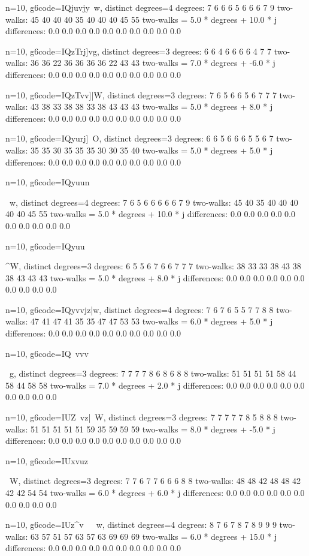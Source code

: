 {{{{{{{{{{{n=10, g6code=IQjuvjy~w, distinct degrees=4
degrees: 7 6 6 6 5 6 6 6 7 9 
two-walks: 45 40 40 40 35 40 40 40 45 55 
two-walks = 5.0 * degrees + 10.0 * j
differences: 0.0 0.0 0.0 0.0 0.0 0.0 0.0 0.0 0.0 0.0 

n=10, g6code=IQzTrj]vg, distinct degrees=3
degrees: 6 6 4 6 6 6 6 4 7 7 
two-walks: 36 36 22 36 36 36 36 22 43 43 
two-walks = 7.0 * degrees + -6.0 * j
differences: 0.0 0.0 0.0 0.0 0.0 0.0 0.0 0.0 0.0 0.0 

n=10, g6code=IQzTvv]|W, distinct degrees=3
degrees: 7 6 5 6 6 5 6 7 7 7 
two-walks: 43 38 33 38 38 33 38 43 43 43 
two-walks = 5.0 * degrees + 8.0 * j
differences: 0.0 0.0 0.0 0.0 0.0 0.0 0.0 0.0 0.0 0.0 

n=10, g6code=IQyurj]~O, distinct degrees=3
degrees: 6 6 5 6 6 6 5 5 6 7 
two-walks: 35 35 30 35 35 35 30 30 35 40 
two-walks = 5.0 * degrees + 5.0 * j
differences: 0.0 0.0 0.0 0.0 0.0 0.0 0.0 0.0 0.0 0.0 

n=10, g6code=IQyuun{~w, distinct degrees=4
degrees: 7 6 5 6 6 6 6 6 7 9 
two-walks: 45 40 35 40 40 40 40 40 45 55 
two-walks = 5.0 * degrees + 10.0 * j
differences: 0.0 0.0 0.0 0.0 0.0 0.0 0.0 0.0 0.0 0.0 

n=10, g6code=IQyuu}}^W, distinct degrees=3
degrees: 6 5 5 6 7 6 6 7 7 7 
two-walks: 38 33 33 38 43 38 38 43 43 43 
two-walks = 5.0 * degrees + 8.0 * j
differences: 0.0 0.0 0.0 0.0 0.0 0.0 0.0 0.0 0.0 0.0 

n=10, g6code=IQyvvjz|w, distinct degrees=4
degrees: 7 6 7 6 5 5 7 7 8 8 
two-walks: 47 41 47 41 35 35 47 47 53 53 
two-walks = 6.0 * degrees + 5.0 * j
differences: 0.0 0.0 0.0 0.0 0.0 0.0 0.0 0.0 0.0 0.0 

n=10, g6code=IQ~vvv}~g, distinct degrees=3
degrees: 7 7 7 7 8 6 8 6 8 8 
two-walks: 51 51 51 51 58 44 58 44 58 58 
two-walks = 7.0 * degrees + 2.0 * j
differences: 0.0 0.0 0.0 0.0 0.0 0.0 0.0 0.0 0.0 0.0 

n=10, g6code=IUZ~vz|~W, distinct degrees=3
degrees: 7 7 7 7 7 8 5 8 8 8 
two-walks: 51 51 51 51 51 59 35 59 59 59 
two-walks = 8.0 * degrees + -5.0 * j
differences: 0.0 0.0 0.0 0.0 0.0 0.0 0.0 0.0 0.0 0.0 

n=10, g6code=IUxvuz}~W, distinct degrees=3
degrees: 7 7 6 7 7 6 6 6 8 8 
two-walks: 48 48 42 48 48 42 42 42 54 54 
two-walks = 6.0 * degrees + 6.0 * j
differences: 0.0 0.0 0.0 0.0 0.0 0.0 0.0 0.0 0.0 0.0 

n=10, g6code=IUz^v~~~w, distinct degrees=4
degrees: 8 7 6 7 8 7 8 9 9 9 
two-walks: 63 57 51 57 63 57 63 69 69 69 
two-walks = 6.0 * degrees + 15.0 * j
differences: 0.0 0.0 0.0 0.0 0.0 0.0 0.0 0.0 0.0 0.0 

}}}}}}}}
